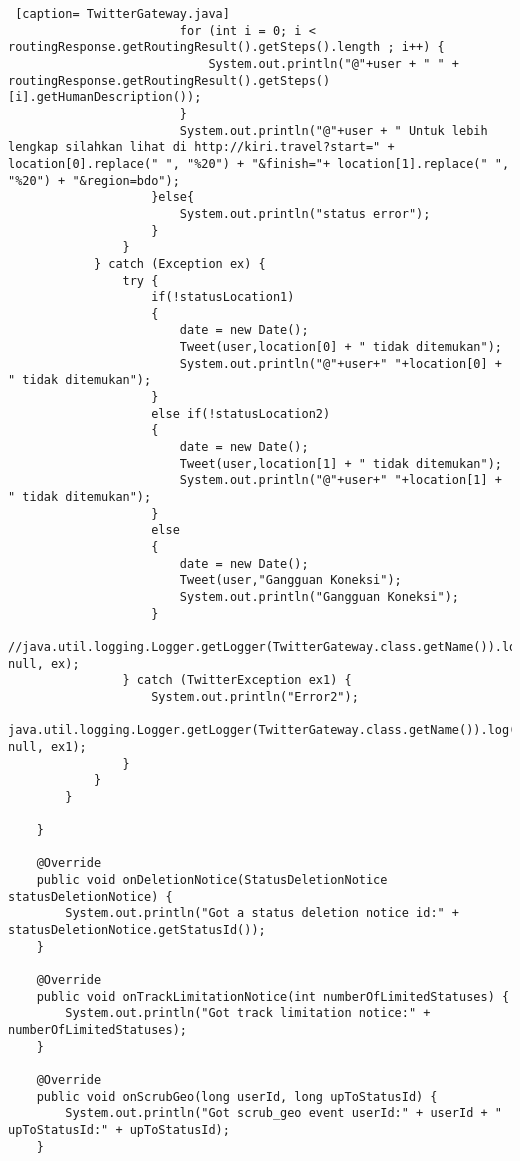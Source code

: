 \begin{lstlisting} [caption= TwitterGateway.java]
                        for (int i = 0; i < routingResponse.getRoutingResult().getSteps().length ; i++) {
                            System.out.println("@"+user + " " + routingResponse.getRoutingResult().getSteps()[i].getHumanDescription());
                        }
                        System.out.println("@"+user + " Untuk lebih lengkap silahkan lihat di http://kiri.travel?start=" + location[0].replace(" ", "%20") + "&finish="+ location[1].replace(" ", "%20") + "&region=bdo");
                    }else{
                        System.out.println("status error");
                    }
                }
            } catch (Exception ex) {
                try {
                    if(!statusLocation1)
                    {
                        date = new Date();
                        Tweet(user,location[0] + " tidak ditemukan");
                        System.out.println("@"+user+" "+location[0] + " tidak ditemukan");
                    }
                    else if(!statusLocation2)
                    {
                        date = new Date();
                        Tweet(user,location[1] + " tidak ditemukan");
                        System.out.println("@"+user+" "+location[1] + " tidak ditemukan");
                    }
                    else
                    {
                        date = new Date();
                        Tweet(user,"Gangguan Koneksi");
                        System.out.println("Gangguan Koneksi");
                    }
                    //java.util.logging.Logger.getLogger(TwitterGateway.class.getName()).log(Level.SEVERE, null, ex);
                } catch (TwitterException ex1) {
                    System.out.println("Error2");
                    java.util.logging.Logger.getLogger(TwitterGateway.class.getName()).log(Level.SEVERE, null, ex1);
                }
            }
        }
        
    }

    @Override
    public void onDeletionNotice(StatusDeletionNotice statusDeletionNotice) {
        System.out.println("Got a status deletion notice id:" + statusDeletionNotice.getStatusId());
    }

    @Override
    public void onTrackLimitationNotice(int numberOfLimitedStatuses) {
        System.out.println("Got track limitation notice:" + numberOfLimitedStatuses);
    }

    @Override
    public void onScrubGeo(long userId, long upToStatusId) {
        System.out.println("Got scrub_geo event userId:" + userId + " upToStatusId:" + upToStatusId);
    }


\end{lstlisting}
